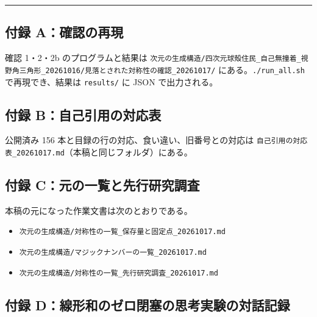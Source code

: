 \documentclass[
  a4paper,
]{ltjsarticle}
\providecommand{\tightlist}{%
  \setlength{\itemsep}{0pt}\setlength{\parskip}{0pt}}
\begin{document}
\begin{center}\rule{0.5\linewidth}{0.5pt}\end{center}

\subsection{付録
A：確認の再現}\label{ux4ed8ux9332-aux78baux8a8dux306eux518dux73fe}

確認 1・2・2b のプログラムと結果は
\texttt{次元の生成構造/\allowbreak{}四次元球殻住民\_\allowbreak{}自己無撞着\_\allowbreak{}視野角三角形\_\allowbreak{}20261016/\allowbreak{}見落とされた対称性の確認\_\allowbreak{}20261017/\allowbreak{}}
にある。\texttt{./\allowbreak{}run\_\allowbreak{}all.sh} で再現でき、結果は \texttt{results/\allowbreak{}} に
JSON で出力される。

\subsection{付録
B：自己引用の対応表}\label{ux4ed8ux9332-bux81eaux5df1ux5f15ux7528ux306eux5bfeux5fdcux8868}

公開済み 156 本と目録の行の対応、食い違い、旧番号との対応は
\texttt{自己引用の対応表\_\allowbreak{}20261017.md}（本稿と同じフォルダ）にある。

\subsection{付録
C：元の一覧と先行研究調査}\label{ux4ed8ux9332-cux5143ux306eux4e00ux89a7ux3068ux5148ux884cux7814ux7a76ux8abfux67fb}

本稿の元になった作業文書は次のとおりである。

\begin{itemize}
\tightlist
\item
  \texttt{次元の生成構造/\allowbreak{}対称性の一覧\_\allowbreak{}保存量と固定点\_\allowbreak{}20261017.md}
\item
  \texttt{次元の生成構造/\allowbreak{}マジックナンバーの一覧\_\allowbreak{}20261017.md}
\item
  \texttt{次元の生成構造/\allowbreak{}対称性の一覧\_\allowbreak{}先行研究調査\_\allowbreak{}20261017.md}
\end{itemize}

\subsection{付録
D：線形和のゼロ閉塞の思考実験の対話記録}\label{ux4ed8ux9332-dux7ddaux5f62ux548cux306eux30bcux30edux9589ux585eux306eux601dux8003ux5b9fux9a13ux306eux5bfeux8a71ux8a18ux9332}
\end{document}
